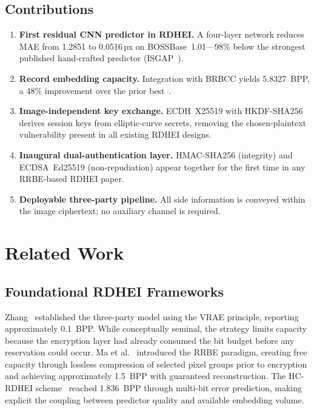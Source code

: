 \documentclass[runningheads]{llncs}
\begin{document}
\subsection*{Contributions}
\begin{enumerate}
\item \textbf{First residual CNN predictor in RDHEI.}
    A four-layer network reduces MAE from 1.2851 to 0.0516\,px
    on BOSSBase~1.01---98\% below the strongest published
    hand-crafted predictor (ISGAP~\cite{ref5}).

\item \textbf{Record embedding capacity.}
    Integration with BRBCC yields 5.8327~BPP, a 48\%
    improvement over the prior best~\cite{ref6}.

\item \textbf{Image-independent key exchange.}
    ECDH~X25519 with HKDF-SHA256 derives session keys from
    elliptic-curve secrets, removing the chosen-plaintext
    vulnerability present in all existing RDHEI designs.

\item \textbf{Inaugural dual-authentication layer.}
    HMAC-SHA256 (integrity) and ECDSA~Ed25519
    (non-repudiation) appear together for the first time in
    any RRBE-based RDHEI paper.

\item \textbf{Deployable three-party pipeline.}
    All side information is conveyed within the image
    ciphertext; no auxiliary channel is required.
\end{enumerate}

\section{Related Work}
\label{sec:related}

\subsection{Foundational RDHEI Frameworks}
Zhang~\cite{ref1} established the three-party model using the
VRAE principle, reporting approximately 0.1~BPP. While
conceptually seminal, the strategy limits capacity because
the encryption layer had already consumed the bit budget
before any reservation could occur. Ma et al.~\cite{ref2}
introduced the RRBE paradigm, creating free capacity through
lossless compression of selected pixel groups prior to
encryption and achieving approximately 1.5~BPP with
guaranteed reconstruction. The HC-RDHEI scheme~\cite{ref9}
reached 1.836~BPP through multi-bit error prediction, making
explicit the coupling between predictor quality and available
embedding volume.
\end{document}
